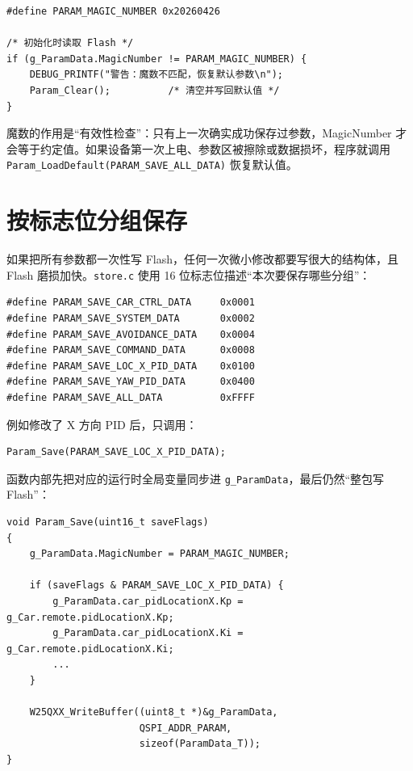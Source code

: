 \begin{lstlisting}[style=c]
#define PARAM_MAGIC_NUMBER 0x20260426

/* 初始化时读取 Flash */
if (g_ParamData.MagicNumber != PARAM_MAGIC_NUMBER) {
    DEBUG_PRINTF("警告：魔数不匹配，恢复默认参数\n");
    Param_Clear();          /* 清空并写回默认值 */
}
\end{lstlisting}

魔数的作用是“有效性检查”：只有上一次确实成功保存过参数，MagicNumber 才会等于约定值。如果设备第一次上电、参数区被擦除或数据损坏，程序就调用 \texttt{Param\_LoadDefault(PARAM\_SAVE\_ALL\_DATA)} 恢复默认值。

\section{按标志位分组保存}

如果把所有参数都一次性写 Flash，任何一次微小修改都要写很大的结构体，且 Flash 磨损加快。\texttt{store.c} 使用 16 位标志位描述“本次要保存哪些分组”：

\begin{lstlisting}[style=c]
#define PARAM_SAVE_CAR_CTRL_DATA     0x0001
#define PARAM_SAVE_SYSTEM_DATA       0x0002
#define PARAM_SAVE_AVOIDANCE_DATA    0x0004
#define PARAM_SAVE_COMMAND_DATA      0x0008
#define PARAM_SAVE_LOC_X_PID_DATA    0x0100
#define PARAM_SAVE_YAW_PID_DATA      0x0400
#define PARAM_SAVE_ALL_DATA          0xFFFF
\end{lstlisting}

例如修改了 X 方向 PID 后，只调用：

\begin{lstlisting}[style=c]
Param_Save(PARAM_SAVE_LOC_X_PID_DATA);
\end{lstlisting}

函数内部先把对应的运行时全局变量同步进 \texttt{g\_ParamData}，最后仍然“整包写 Flash”：

\begin{lstlisting}[style=c]
void Param_Save(uint16_t saveFlags)
{
    g_ParamData.MagicNumber = PARAM_MAGIC_NUMBER;

    if (saveFlags & PARAM_SAVE_LOC_X_PID_DATA) {
        g_ParamData.car_pidLocationX.Kp = g_Car.remote.pidLocationX.Kp;
        g_ParamData.car_pidLocationX.Ki = g_Car.remote.pidLocationX.Ki;
        ...
    }

    W25QXX_WriteBuffer((uint8_t *)&g_ParamData,
                       QSPI_ADDR_PARAM,
                       sizeof(ParamData_T));
}
\end{lstlisting}


